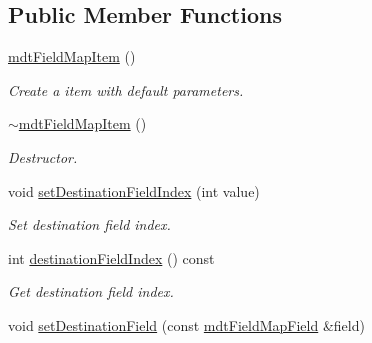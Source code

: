 \subsection*{Public Member Functions}
\begin{DoxyCompactItemize}
\item 
\hyperlink{classmdt_field_map_item_a36e1f695842b8ba275f535db80fc8033}{mdtFieldMapItem} ()
\begin{DoxyCompactList}\small\item\em Create a item with default parameters. \end{DoxyCompactList}\item 
\hypertarget{classmdt_field_map_item_a8b0a74671b7ade65d8d17274727b2269}{
\hyperlink{classmdt_field_map_item_a8b0a74671b7ade65d8d17274727b2269}{$\sim$mdtFieldMapItem} ()}
\label{classmdt_field_map_item_a8b0a74671b7ade65d8d17274727b2269}

\begin{DoxyCompactList}\small\item\em Destructor. \end{DoxyCompactList}\item 
\hypertarget{classmdt_field_map_item_af49fa592e62430611222450aa8e60549}{
void \hyperlink{classmdt_field_map_item_af49fa592e62430611222450aa8e60549}{setDestinationFieldIndex} (int value)}
\label{classmdt_field_map_item_af49fa592e62430611222450aa8e60549}

\begin{DoxyCompactList}\small\item\em Set destination field index. \end{DoxyCompactList}\item 
\hypertarget{classmdt_field_map_item_ac5fc1ed4a1ef485d4d6727603b247000}{
int \hyperlink{classmdt_field_map_item_ac5fc1ed4a1ef485d4d6727603b247000}{destinationFieldIndex} () const }
\label{classmdt_field_map_item_ac5fc1ed4a1ef485d4d6727603b247000}

\begin{DoxyCompactList}\small\item\em Get destination field index. \end{DoxyCompactList}\item 
\hypertarget{classmdt_field_map_item_a4bbd4dba1292f825d96c3eef232620fc}{
void \hyperlink{classmdt_field_map_item_a4bbd4dba1292f825d96c3eef232620fc}{setDestinationField} (const \hyperlink{classmdt_field_map_field}{mdtFieldMapField} \&field)}
\label{classmdt_field_map_item_a4bbd4dba1292f825d96c3eef232620fc}


\end{DoxyCompactItemize}
